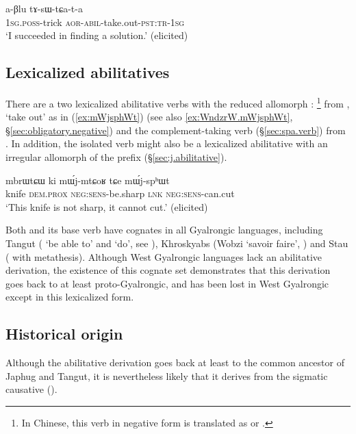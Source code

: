 \begin{exe}
\ex \label{ex:aBlu.tAsWtCAta}
 \gll  a-βlu tɤ-sɯ-tɕa-t-a \\
  \textsc{1sg}.\textsc{poss}-trick \textsc{aor}-\textsc{abil}-take.out-\textsc{pst}:\textsc{tr}-\textsc{1sg} \\
\glt `I succeeded in finding a solution.' (elicited)
\end{exe} 
 
\subsection{Lexicalized abilitatives} \label{sec:abilitative.lexicalized}
There are a two lexicalized abilitative verbs with the reduced allomorph : \footnote{In Chinese, this verb in negative form is translated as  or  . } from , `take out' as in (\ref{ex:mWjsphWt}) (see also \ref{ex:WndzrW.mWjsphWt}, §\ref{sec:obligatory.negative}) and the com\-ple\-ment-taking verb  (§\ref{sec:spa.verb}) from  . In addition, the isolated verb  might also be a lexicalized abilitative with an irregular allomorph of the prefix (§\ref{sec:j.abilitative}).

 \begin{exe}
\ex \label{ex:mWjsphWt}
 \gll mbrɯtɕɯ ki mɯ́j-mtɕoʁ tɕe mɯ́j-spʰɯt \\
 knife \textsc{dem}.\textsc{prox} \textsc{neg}:\textsc{sens}-be.sharp \textsc{lnk} \textsc{neg}:\textsc{sens}-can.cut \\
 \glt `This knife is not sharp, it cannot cut.' (elicited)
\end{exe}

Both  and its base verb   have cognates in all Gyalrongic languages, including Tangut ( `be able to' and   `do', see \citealt[86;255-256]{jacques14esquisse}), Khroskyabs (Wobzi  `savoir faire', \citealt[475]{lai17khroskyabs}) and Stau ( with metathesis). Although West Gyalrongic languages lack an abilitative derivation, the existence of this cognate set demonstrates that this derivation goes back  to at least proto-Gyalrongic, and has been lost in West Gyalrongic except in this lexicalized form.
 
\subsection{Historical origin} \label{sec:abilitative.origin}
Although the abilitative derivation goes back at least to the common ancestor of Japhug and Tangut, it is nevertheless likely that it derives from the sigmatic causative (\citealt[190]{jacques15causative}).

